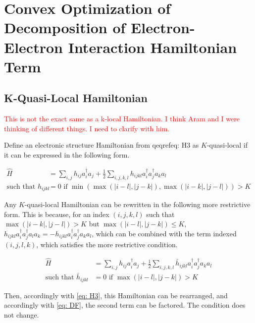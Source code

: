 

\chapter{Convex Optimization of Decomposition of Electron-Electron Interaction Hamiltonian Term}

\section{K-Quasi-Local Hamiltonian}

\textcolor{red}{This is not the exact same as a k-local Hamiltonian. I think Aram and I were thinking of different things. I need to clarify with him.}

Define an electronic structure Hamiltonian from qeqref{eq: H3} as $K$-quasi-local if it can be expressed in the following form.

\begin{equation}
    \begin{split}
        \hat{H} &= \sum_{i, j} h_{ij}a^\dag_ia_j + \frac{1}{2}\sum_{i,j,k,l} h_{ijkl}a^\dag_ia^\dag_ja_ka_l  \\
        \text{such that } h_{ijkl} &= 0 \text{ if } \min(\max(|i - l|, |j - k|), \max(|i - k|, |j - l|)) > K
    \end{split}
\end{equation}

Any $K$-quasi-local Hamiltonian can be rewritten in the following more restrictive form. This is because, for an index $(i, j, k, l)$ such that $\max(|i - k|, |j - l|) > K$ but $\max(|i - l|, |j - k|) \leq K$, $h_{ijkl}a^\dag_ia^\dag_ja_la_k = -h_{ijkl}a^\dag_ia^\dag_ja_ka_l$, which can be combined with the term indexed $(i, j, l, k)$, which satisfies the more restrictive condition.

\begin{equation}
    \begin{split}
        \hat{H} &= \sum_{i, j} h_{ij}a^\dag_ia_j + \frac{1}{2}\sum_{i,j,k,l} \bar{h}_{ijkl}a^\dag_ia^\dag_ja_ka_l \\
        \text{such that } \bar{h}_{ijkl} &= 0 \text{ if } \max(|i - l|, |j - k|) > K
    \end{split}
\end{equation}

Then, accordingly with \eqref{eq: H3}, this Hamiltonian can be rearranged, and accordingly with \eqref{eq: DF}, the second term can be factored. The condition does not change.

